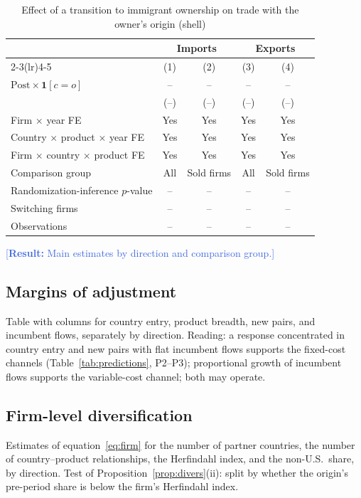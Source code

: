 \documentclass[12pt]{article}
\theoremstyle{remark}
\newcommand{\result}[1]{\textcolor{RoyalBlue}{[\textbf{Result:} #1]}}
\newcommand{\planned}[1]{\textcolor{OliveGreen}{#1}}
\newcommand{\Post}{\mathrm{Post}}
\newcommand{\one}{\mathbf{1}}
\begin{document}
\begin{table}[htbp]\centering\small
\caption{Effect of a transition to immigrant ownership on trade with the owner's origin (shell)}
\label{tab:main}
\begin{tabular}{lcccc}
\toprule
 & \multicolumn{2}{c}{Imports} & \multicolumn{2}{c}{Exports}\\
\cmidrule(lr){2-3}\cmidrule(lr){4-5}
 & (1) & (2) & (3) & (4)\\
\midrule
$\Post\times\one[c=o]$ & -- & -- & -- & -- \\
 & (--) & (--) & (--) & (--) \\
\midrule
Firm $\times$ year FE & Yes & Yes & Yes & Yes \\
Country $\times$ product $\times$ year FE & Yes & Yes & Yes & Yes \\
Firm $\times$ country $\times$ product FE & Yes & Yes & Yes & Yes \\
Comparison group & All & Sold firms & All & Sold firms \\
Randomization-inference $p$-value & -- & -- & -- & -- \\
Switching firms & -- & -- & -- & -- \\
Observations & -- & -- & -- & -- \\
\bottomrule
\end{tabular}
\end{table}

\result{Main estimates by direction and comparison group.}

\subsection{Margins of adjustment}

\planned{Table with columns for country entry, product breadth, new pairs, and
incumbent flows, separately by direction. Reading: a response concentrated in
country entry and new pairs with flat incumbent flows supports the fixed-cost
channels (Table~\ref{tab:predictions}, P2--P3); proportional growth of
incumbent flows supports the variable-cost channel; both may operate.}

\subsection{Firm-level diversification}

\planned{Estimates of equation~\eqref{eq:firm} for the number of partner
countries, the number of country--product relationships, the Herfindahl index,
and the non-U.S.\ share, by direction. Test of
Proposition~\ref{prop:divers}(ii): split by whether the origin's pre-period
share is below the firm's Herfindahl index.}
\end{document}

